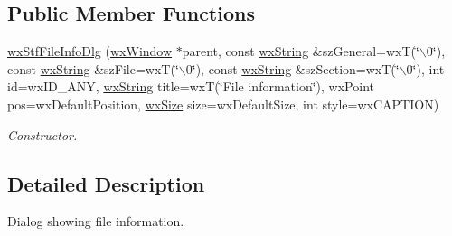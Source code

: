 \subsection*{Public Member Functions}
\begin{DoxyCompactItemize}
\item 
\hyperlink{classwxStfFileInfoDlg_aec5a9c07dd33df20112fa6fce63cd1c3}{wxStfFileInfoDlg} (\hyperlink{classwxWindow}{wxWindow} $\ast$parent, const \hyperlink{classwxString}{wxString} \&szGeneral=wxT(\char`\"{}$\backslash$0\char`\"{}), const \hyperlink{classwxString}{wxString} \&szFile=wxT(\char`\"{}$\backslash$0\char`\"{}), const \hyperlink{classwxString}{wxString} \&szSection=wxT(\char`\"{}$\backslash$0\char`\"{}), int id=wxID\_\-ANY, \hyperlink{classwxString}{wxString} title=wxT(\char`\"{}File information\char`\"{}), wxPoint pos=wxDefaultPosition, \hyperlink{classwxSize}{wxSize} size=wxDefaultSize, int style=wxCAPTION)
\begin{DoxyCompactList}\small\item\em Constructor. \item\end{DoxyCompactList}\end{DoxyCompactItemize}


\subsection{Detailed Description}
Dialog showing file information. 

